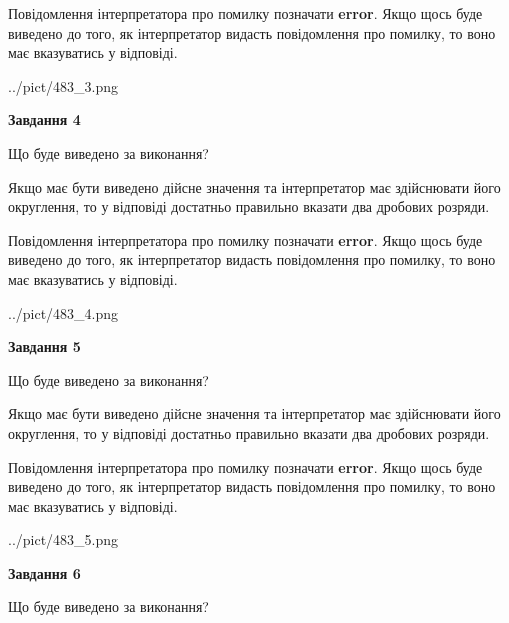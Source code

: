\documentclass[12pt, ukrainian]{article}
\begin{document}
{\begin {Large}
Повідомлення інтерпретатора про помилку позначати \textbf{error}.
Якщо щось буде виведено до того, як інтерпретатор видасть повідомлення про помилку, 
то воно має вказуватись у відповіді. \par

\begin{center}
	{../pict/483_3.png}
\end{center}
\newpage

{\begin {center}\textbf{Завдання 4}\end {center}}\par
Що буде виведено за виконання? \par

Якщо має бути виведено дійсне значення та інтерпретатор має здійснювати його округлення, 
то у відповіді достатньо правильно вказати два дробових розряди.

Повідомлення інтерпретатора про помилку позначати \textbf{error}.
Якщо щось буде виведено до того, як інтерпретатор видасть повідомлення про помилку, 
то воно має вказуватись у відповіді. \par

\begin{center}
	{../pict/483_4.png}
\end{center}
\newpage

{\begin {center}\textbf{Завдання 5}\end {center}}\par
Що буде виведено за виконання? \par

Якщо має бути виведено дійсне значення та інтерпретатор має здійснювати його округлення, 
то у відповіді достатньо правильно вказати два дробових розряди.

Повідомлення інтерпретатора про помилку позначати \textbf{error}.
Якщо щось буде виведено до того, як інтерпретатор видасть повідомлення про помилку, 
то воно має вказуватись у відповіді. \par

\begin{center}
	{../pict/483_5.png}
\end{center}
\newpage

{\begin {center}\textbf{Завдання 6}\end {center}}\par
Що буде виведено за виконання? \par


\end{Large}}
\end{document}
